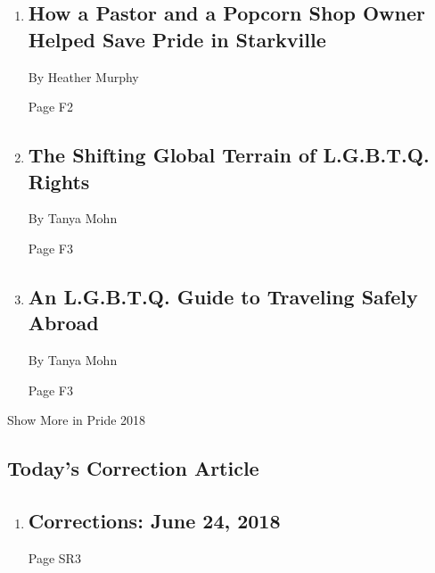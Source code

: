 \begin{enumerate}
\def\labelenumi{\arabic{enumi}.}
\item
  \href{/2018/06/21/us/pride-starkville-mississippi.html}{}

  \hypertarget{how-a-pastor-and-a-popcorn-shop-owner-helped-save-pride-in-starkville}{%
  \subsection{How a Pastor and a Popcorn Shop Owner Helped Save Pride in
  Starkville}\label{how-a-pastor-and-a-popcorn-shop-owner-helped-save-pride-in-starkville}}

  By Heather Murphy

  Page F2
\item
  \href{/2018/06/21/world/lgbtq-global-rights.html}{}

  \hypertarget{the-shifting-global-terrain-of-lgbtq-rights}{%
  \subsection{The Shifting Global Terrain of L.G.B.T.Q.
  Rights}\label{the-shifting-global-terrain-of-lgbtq-rights}}

  By Tanya Mohn

  Page F3
\item
  \href{/2018/06/21/travel/lgbtq-travel-advice.html}{}

  \hypertarget{an-lgbtq-guide-to-traveling-safely-abroad}{%
  \subsection{An L.G.B.T.Q. Guide to Traveling Safely
  Abroad}\label{an-lgbtq-guide-to-traveling-safely-abroad}}

  By Tanya Mohn

  Page F3
\end{enumerate}

Show More in Pride 2018

\hypertarget{todays-correction-article}{%
\subsection{Today's Correction
Article}\label{todays-correction-article}}

\begin{enumerate}
\def\labelenumi{\arabic{enumi}.}
\item
  \href{/2018/06/24/pageoneplus/corrections-june-24-2018.html}{}

  \hypertarget{corrections-june-24-2018}{%
  \subsection{Corrections: June 24,
  2018}\label{corrections-june-24-2018}}

  Page SR3
\end{enumerate}

